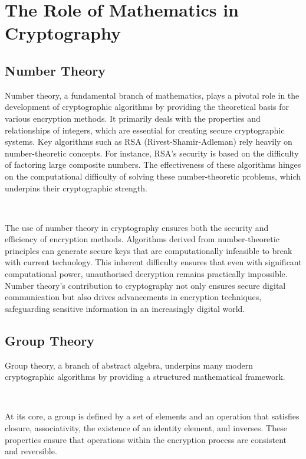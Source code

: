 \documentclass[11pt]{article}
\begin{document}
\section{The Role of Mathematics in Cryptography}



\subsection{Number Theory}
Number theory, a fundamental branch of mathematics, plays a pivotal role in the development of cryptographic algorithms by providing the theoretical basis for various encryption methods. It primarily deals with the properties and relationships of integers, which are essential for creating secure cryptographic systems. Key algorithms such as RSA (Rivest-Shamir-Adleman) rely heavily on number-theoretic concepts. For instance, RSA's security is based on the difficulty of factoring large composite numbers. The effectiveness of these algorithms hinges on the computational difficulty of solving these number-theoretic problems, which underpins their cryptographic strength.

\

The use of number theory in cryptography ensures both the security and efficiency of encryption methods. Algorithms derived from number-theoretic principles can generate secure keys that are computationally infeasible to break with current technology. This inherent difficulty ensures that even with significant computational power, unauthorised decryption remains practically impossible. Number theory's contribution to cryptography not only ensures secure digital communication but also drives advancements in encryption techniques, safeguarding sensitive information in an increasingly digital world.


\subsection{Group Theory}
Group theory, a branch of abstract algebra, underpins many modern cryptographic algorithms by providing a structured mathematical framework. 

\

At its core, a group is defined by a set of elements and an operation that satisfies closure, associativity, the existence of an identity element, and inverses. These properties ensure that operations within the encryption process are consistent and reversible. 
\end{document}
